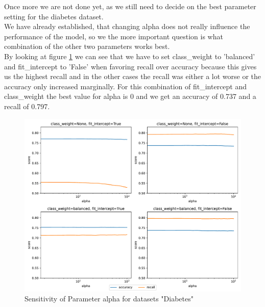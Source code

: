 \documentclass[a4paper,10pt]{article}
\begin{document}
Once more we are not done yet, as we still need to decide on the best parameter setting for the diabetes dataset.\\
We have already established, that changing \textsf{alpha} does not really influence the performance of the model, so we the more important question is what combination of the other two parameters works best.\\
By looking at figure \ref{fig:sensitivity ridge diabetes} we can see that we have to set \textsf{class\_weight} to 'balanced' and \textsf{fit\_intercept} to 'False' when favoring recall over accuracy because this gives us the highest recall and in the other cases the recall was either a lot worse or the accuracy only increased marginally. For this combination of \textsf{fit\_intercept} and \textsf{class\_weight} the best value for alpha is 0 and we get an accuracy of 0.737 and a recall of 0.797.%

\begin{figure}[h!]
    \centering
    \includegraphics[width=\textwidth]{diabetes/plots/ridge_parameter_sensitivity.pdf}
    \caption{Sensitivity of Parameter alpha for datasets "Diabetes"}
    \label{fig:sensitivity ridge diabetes}
    \end{figure}
\end{document}
